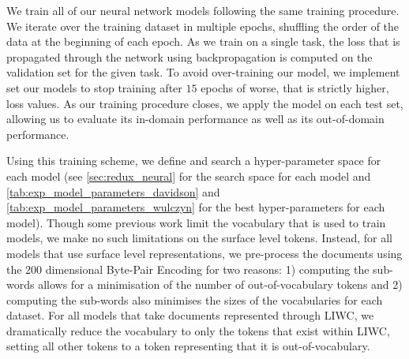 We train all of our neural network models following the same training procedure. We iterate over the training dataset in multiple epochs, shuffling the order of the data at the beginning of each epoch. As we train on a single task, the loss that is propagated through the network using backpropagation is computed on the validation set for the given task. To avoid over-training our model, we implement set our models to stop training after $15$ epochs of worse, that is strictly higher, loss values. As our training procedure closes, we apply the model on each test set, allowing us to evaluate its in-domain performance as well as its out-of-domain performance.

Using this training scheme, we define and search a hyper-parameter space for each model (see \autoref{sec:redux_neural} for the search space for each model and \autoref{tab:exp_model_parameters_davidson} and \autoref{tab:exp_model_parameters_wulczyn} for the best hyper-parameters for each model). Though some previous work \cite{Waseem:2018, CITE: Other papers that restrict vocabulary sizes} limit the vocabulary that is used to train models, we make no such limitations on the surface level tokens. Instead, for all models that use surface level representations, we pre-process the documents using the 200 dimensional Byte-Pair Encoding \cite{Heinzerling:2018} for two reasons: 1) computing the sub-words allows for a minimisation of the number of out-of-vocabulary tokens and 2) computing the sub-words also minimises the sizes of the vocabularies for each dataset. For all models that take documents represented through LIWC, we dramatically reduce the vocabulary to only the tokens that exist within LIWC, setting all other tokens to a token representing that it is out-of-vocabulary.




